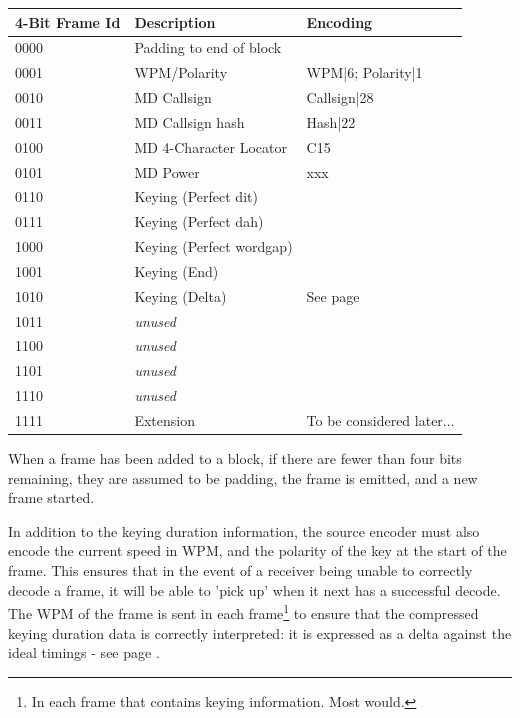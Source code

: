 \documentclass[a4paper]{tufte-handout}
\begin{document}
    \begin{table}[!h]

        \selectfont
        \begin{tabular}{lll}
            \toprule
            4-Bit Frame Id & Description & Encoding \\
            \midrule
            0000 & Padding to end of block &  \\
            0001 & WPM/Polarity & WPM|6; Polarity|1 \\ 
            0010 & MD Callsign & Callsign|28 \\
            0011 & MD Callsign hash & Hash|22 \\
            0100 & MD 4-Character Locator & C15 \\
            0101 & MD Power & xxx \\
            0110 & Keying (Perfect dit) & \\
            0111 & Keying (Perfect dah) & \\
            1000 & Keying (Perfect wordgap) & \\
            1001 & Keying (End) & \\
            1010 & Keying (Delta) & See page \pageref{section:delta-encoding} \\
            1011 & \emph{unused} & \\
            1100 & \emph{unused} & \\
            1101 & \emph{unused} & \\
            1110 & \emph{unused} & \\
            1111 & Extension & To be considered later... \\
		\end{tabular}
	\end{table}

When a frame has been added to a block, if there are fewer than four bits remaining, they are assumed to be padding, the frame is emitted, and a new frame started.

In addition to the keying duration information, the source encoder must also encode the current speed in WPM, and the polarity of the key at the start of the frame. This ensures that in the event of a receiver being unable to correctly decode a frame, it will be able to 'pick up' when it next has a successful decode. The WPM of the frame is sent in each frame\footnote{In each frame that contains keying information. Most would.} to ensure that the compressed keying duration data is correctly interpreted: it is expressed as a delta against the ideal timings - see page \pageref{section:delta-encoding}.
\end{document}
